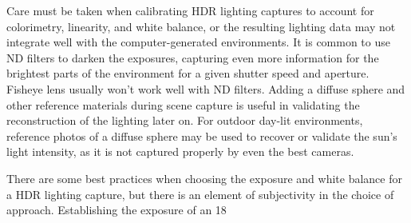 Care must be taken when calibrating HDR lighting captures to account for colorimetry, linearity, and white balance, or the resulting lighting data may not integrate well with the computer-generated environments. It is common to use ND filters to darken the exposures, capturing even more information for the brightest parts of the environment for a given shutter speed and aperture. Fisheye lens usually won’t work well with ND filters. Adding a diffuse sphere and other reference materials during scene capture is useful in validating the reconstruction of the lighting later on. For outdoor day-lit environments, reference photos of a diffuse sphere may be used to recover or validate the sun’s light intensity, as it is not captured properly by even the best cameras.

There are some best practices when choosing the exposure and white balance for a HDR lighting capture, but there is an element of subjectivity in the choice of approach. Establishing the exposure of an 18%

